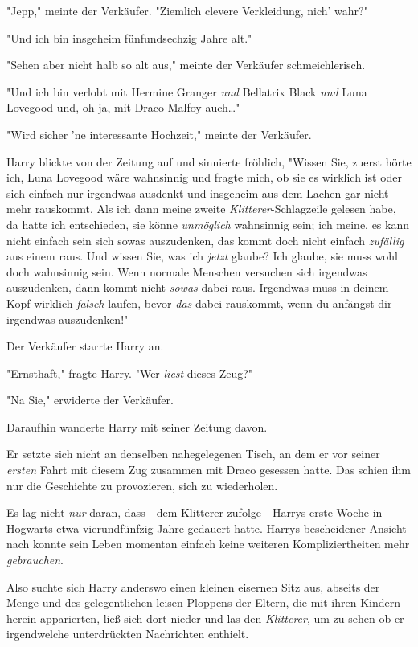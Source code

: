 {"Jepp," meinte der Verkäufer. "Ziemlich clevere Verkleidung, nich' wahr?"

"Und ich bin insgeheim fünfundsechzig Jahre alt."

"Sehen aber nicht halb so alt aus," meinte der Verkäufer schmeichlerisch.

"Und ich bin verlobt mit Hermine Granger \emph{und} Bellatrix Black \emph{und} Luna Lovegood und, oh ja, mit Draco Malfoy auch…"

"Wird sicher 'ne interessante Hochzeit," meinte der Verkäufer.

Harry blickte von der Zeitung auf und sinnierte fröhlich, "Wissen Sie, zuerst hörte ich, Luna Lovegood wäre wahnsinnig und fragte mich, ob sie es wirklich ist oder sich einfach nur irgendwas ausdenkt und insgeheim aus dem Lachen gar nicht mehr rauskommt. Als ich dann meine zweite \emph{Klitterer}-Schlagzeile gelesen habe, da hatte ich entschieden, sie könne \emph{unmöglich} wahnsinnig sein; ich meine, es kann nicht einfach sein sich sowas auszudenken, das kommt doch nicht einfach \emph{zufällig} aus einem raus. Und wissen Sie, was ich \emph{jetzt} glaube? Ich glaube, sie muss wohl doch wahnsinnig sein. Wenn normale Menschen versuchen sich irgendwas auszudenken, dann kommt nicht \emph{sowas} dabei raus. Irgendwas muss in deinem Kopf wirklich \emph{falsch} laufen, bevor \emph{das} dabei rauskommt, wenn du anfängst dir irgendwas auszudenken!"

Der Verkäufer starrte Harry an.

"Ernsthaft," fragte Harry. "Wer \emph{liest} dieses Zeug?"

"Na Sie," erwiderte der Verkäufer.

Daraufhin wanderte Harry mit seiner Zeitung davon.

Er setzte sich nicht an denselben nahegelegenen Tisch, an dem er vor seiner \emph{ersten} Fahrt mit diesem Zug zusammen mit Draco gesessen hatte. Das schien ihm nur die Geschichte zu provozieren, sich zu wiederholen.

Es lag nicht \emph{nur} daran, dass - dem Klitterer zufolge - Harrys erste Woche in Hogwarts etwa vierundfünfzig Jahre gedauert hatte. Harrys bescheidener Ansicht nach konnte sein Leben momentan einfach keine weiteren Kompliziertheiten mehr \emph{gebrauchen}.

Also suchte sich Harry anderswo einen kleinen eisernen Sitz aus, abseits der Menge und des gelegentlichen leisen Ploppens der Eltern, die mit ihren Kindern herein apparierten, ließ sich dort nieder und las den \emph{Klitterer}, um zu sehen ob er irgendwelche unterdrückten Nachrichten enthielt.

}

